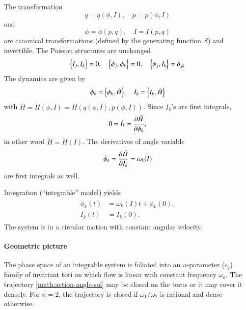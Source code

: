 The transformation
\begin{equation*}
	q = q(\phi, I), \quad p = p(\phi, I)
\end{equation*}
and 
\begin{equation*}
	\phi = \phi(p, q) ,\quad I = I(p, q)
\end{equation*}
are canonical transformations (defined by the generating function $S$) and invertible. The Poisson structures are unchanged
\begin{align*}
	\pb{I_j}{I_k} = 0, \quad \pb{\phi_j}{\phi_k} = 0, \quad \pb{\phi_j}{I_k} = \delta_{jk}
	\label{eq:}
\end{align*}
The dynamics are given by
\begin{align*}
	\dot{\phi}_k = \pb{\phi_k}{\tilde{H}}, \quad \dot{I}_k = \pb{I_k}{\tilde{H}}
\end{align*}
with $\tilde{H} = \tilde{H}(\phi, I) = H(q(\phi, I), p(\phi, I))$. Since $I_k$'s are first integrals, 
\begin{equation*}
	0 = \dot{I}_k = \pdv{\tilde{H}}{\phi_k} ,
\end{equation*}
in other word $\tilde{H} = \tilde{H}(I)$. The derivatives of angle variable
\begin{equation*}
	\dot{\phi}_k = \pdv{\tilde{H}}{I_k} = \omega_k (I)
\end{equation*}
are first integrals as well.

Integration (``integrable'' model) yields
\begin{align}
	\begin{split}
		\phi_k (t) &= \omega_k(I) t + \phi_k (0), \\
		I_k(t) &= I_k(0).
	\end{split}
	\label{math:action-angle-sol}
\end{align}
The system is in a circular motion with constant angular velocity.

\paragraph{Geometric picture}
The phase space of an integrable system  is  foliated into an $n$-parameter ($c_j$) family of invariant tori on which flow is linear with constant frequency $\omega_k$. The trajectory \eqref{math:action-angle-sol} may be closed on the torus or it may cover it densely. For $n=2$, the trajectory is closed if $\omega_1/\omega_2$  is rational and dense otherwise.

